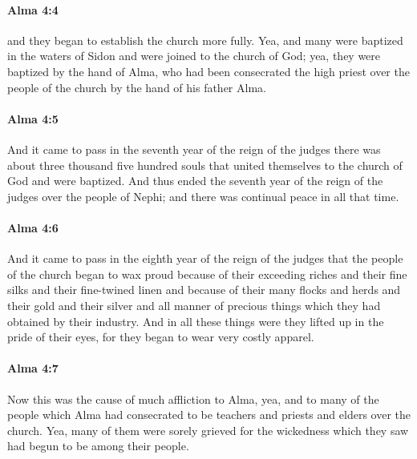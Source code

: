 		\paragraph{Alma 4:4} %
			\label{ALMA-4-4}

			and they began to establish the church more fully.
			Yea, and many were baptized in the waters of Sidon
			and were joined to the church of God;
			yea, they were baptized by the hand of Alma,
			who had been consecrated the high priest over the people of the church
			by the hand of his father Alma.

		\paragraph{Alma 4:5} %
			\label{ALMA-4-5}

			And it came to pass in the seventh year of the reign of the judges
			there was about three thousand five hundred souls
			that united themselves to the church of God and were baptized.
			And thus ended the seventh year
			of the reign of the judges over the people of Nephi;
			and there was continual peace in all that time.

		\paragraph{Alma 4:6} %
			\label{ALMA-4-6}

			And it came to pass in the eighth year of the reign of the judges
			that the people of the church began to wax proud
			because of their exceeding riches and their fine silks and their fine-twined linen
			and because of their many flocks and herds
			and their gold and their silver and all manner of precious things
			which they had obtained by their industry.
			And in all these things were they lifted up in the pride of their eyes,
			for they began to wear very costly apparel.

		\paragraph{Alma 4:7} %
			\label{ALMA-4-7}

			Now this was the cause of much affliction to Alma,
			yea, and to many of the people which Alma had consecrated
			to be teachers and priests and elders over the church.
			Yea, many of them were sorely grieved for the wickedness
			which they saw had begun to be among their people.

